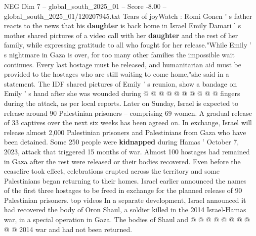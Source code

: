 \begin{textsample}{NEG Dim 7 – global\_south\_2025\_01 – Score -8.00 – global\_south\_2025\_01/120207945.txt}
Tears of joyWatch : Romi Gonen ' s father reacts to the news that his \textbf{daughter} is back home in Israel Emily Damari ' s mother shared pictures of a video call with her \textbf{daughter} and the rest of her family, while expressing gratitude to all who fought for her release."While Emily ' s nightmare in Gaza is over, for too many other families the impossible wait continues.
Every last hostage must be released, and humanitarian aid must be provided to the hostages who are still waiting to come home,"she said in a statement.
The IDF shared pictures of Emily ' s reunion, show a bandage on Emily ' s hand after she was wounded during @ @ @ @ @ @ @ @ @ @ fingers during the attack, as per local reports.
Later on Sunday, Israel is expected to release around 90 Palestinian prisoners -- comprising 69 women.
A gradual release of 33 captives over the next six weeks has been agreed on.
In exchange, Israel will release almost 2,000 Palestinian prisoners and Palestinians from Gaza who have been detained.
Some 250 people were \textbf{kidnapped} during Hamas ' October 7, 2023, attack that triggered 15 months of war.
Almost 100 hostages had remained in Gaza after the rest were released or their bodies recovered.
Even before the ceasefire took effect, celebrations erupted across the territory and some Palestinians began returning to their homes.
Israel earlier announced the names of the first three hostages to be freed in exchange for the planned release of 90 Palestinian prisoners. top videos In a separate development, Israel announced it had recovered the body of Oron Shaul, a soldier killed in the 2014 Israel-Hamas war, in a special operation in Gaza.
The bodies of Shaul and @ @ @ @ @ @ @ @ @ @ 2014 war and had not been returned.

\end{textsample}
